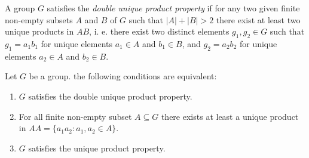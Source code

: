 A group $G$ satisfies the {\em double unique product property} if for any two given finite non-empty 
subsets $A$ and $B$ of $G$ such that $|A|+|B|>2$ there exist at least two unique products in $AB$, i. e. there exist two distinct elements $g_1,g_2\in G$ such that $g_1=a_1b_1$ for unique elements $a_1\in A$ and $b_1\in B$, and $g_2=a_2b_2$ for unique elements $a_2\in A$ and $b_2\in B$. 

\begin{theorem}[Strojnowski]
	\label{thm:Strojnowski}
	Let $G$ be a group. the following conditions are equivalent:
	\begin{enumerate}
		\item $G$ satisfies the double unique product property.
		\item For all finite non-empty subset $A\subseteq G$ there exists at least a unique product in $AA=\{a_1a_2:a_1,a_2\in A\}$.
		\item $G$ satisfies the unique product property.
	\end{enumerate}
\end{theorem}

